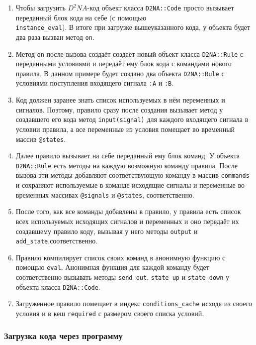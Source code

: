\documentclass[utf8,a5paper,portrait,10pt]{eskdtext}
\begin{document}
\begin{enumerate}
  \item Чтобы загрузить $D^2NA$-код объект класса \texttt{D2NA::Code} просто
        вызывает переданный блок кода на себе (с помощью\\
        \texttt{instance\_eval}). В итоге при загрузке вышеуказанного кода, у
        объекта будет два раза вызван метод \texttt{on}.
  \item Метод \texttt{on} после вызова создаёт создаёт новый объект класса
        \texttt{D2NA::Rule} с переданными условиями и передаёт ему блок кода с
        командами нового правила. В данном примере будет создано два объекта
        \texttt{D2NA::Rule} с условиями поступления входящего сигнала
        \texttt{:A} и \texttt{:B}.
  \item Код должен заранее знать список используемых в нём переменных и
        сигналов. Поэтому, правило сразу после создания вызывает метод у
        создавшего его кода метод \texttt{input(signal)} для каждого входящего
        сигнала в условии правила, а все переменные из условия помещает во
        временный массив \texttt{@states}.
  \item Далее правило вызывает на себе переданный ему блок команд. У объекта
        \texttt{D2NA::Rule} есть методы на каждую возможную команду правила.
        После вызова эти методы добавляют соответствующую команду в массив
        \texttt{commands} и сохраняют используемые в команде исходящие сигналы и
        переменные во временных массивах \texttt{@signals} и \texttt{@states},
        соответственно.
  \item После того, как все команды добавлены в правило, у правила есть список
        всех используемых исходящих сигналов и переменных и оно передаёт их
        создавшему правило коду, вызывая у него методы \texttt{output} и
        \texttt{add\_state},соответственно.
  \item Правило компилирует список своих команд в анонимную функцию с помощью
        \texttt{eval}. Анонимная функция для каждой команду будет соответственно
        вызывать методы \texttt{send\_out}, \texttt{state\_up} и
        \texttt{state\_down} у объекта класса \texttt{D2NA::Code}.
  \item Загруженное правило помещает в индекс \texttt{conditions\_cache} исходя
        из своего условия и в кеш \texttt{required} с размером своего списка
        условий.
\end{enumerate}

\subsubsection{Загрузка кода через программу}
\end{document}
